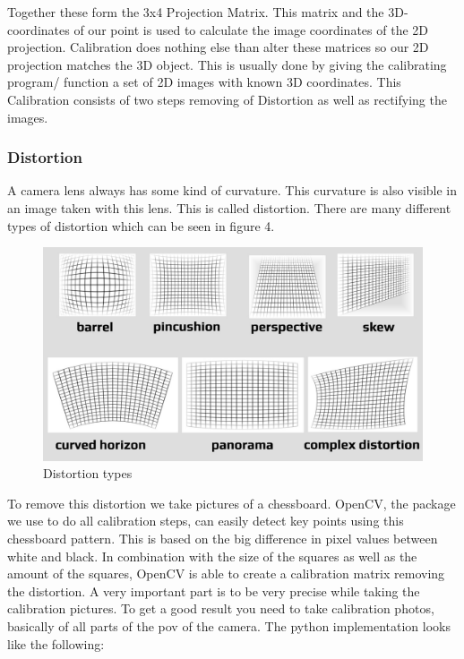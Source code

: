 \documentclass[journal,onecolumn]{IEEEtran}
\begin{document}
\noindent
Together these form the 3x4 Projection Matrix. This matrix and the 3D-coordinates of our point is used to calculate the image coordinates of the 2D projection. Calibration does nothing else than alter these matrices so our 2D projection matches the 3D object. This is usually done by giving the calibrating program/ function a set of 2D images with known 3D coordinates.\newline
This Calibration consists of two steps removing of Distortion as well as rectifying the images\cite{ImageRectification}.
\subsubsection{Distortion}
\noindent
A camera lens always has some kind of curvature. This curvature is also visible in an image taken with this lens. This is called distortion. There are many different types of distortion which can be seen in figure 4.
\begin{figure}[H]
	\centering
	\includegraphics[scale=0.3]{distortion.jpg}
	\caption{Distortion types}
\end{figure}
\noindent
To remove this distortion we take pictures of a chessboard. OpenCV, the package we use to do all calibration steps, can easily detect key points using this chessboard pattern. This is based on the big difference in pixel values between white and black. In combination with the size of the squares as well as the amount of the squares, OpenCV is able to create a calibration matrix removing the distortion.\newline
A very important part is to be very precise while taking the calibration pictures. To get a good result you need to take calibration photos, basically of all parts of the pov of the camera.\newline
The python implementation looks like the following:
\end{document}
